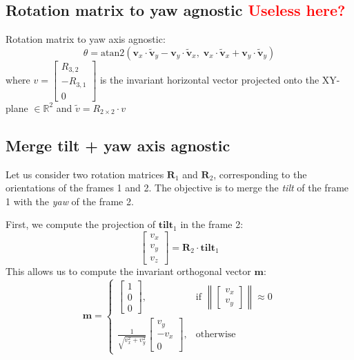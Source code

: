 \documentclass{IJCAS}
\begin{document}
\subsection{Rotation matrix to yaw agnostic \textcolor{red}{Useless here?}}

Rotation matrix to yaw axis agnostic:
\begin{equation}
\theta = \mathrm{atan2}\left( \boldsymbol{v}_x \cdot \tilde{\boldsymbol{v}}_y - \boldsymbol{v}_y \cdot \tilde{\boldsymbol{v}}_x,\; \boldsymbol{v}_x \cdot \tilde{\boldsymbol{v}}_x + \boldsymbol{v}_y \cdot \tilde{\boldsymbol{v}}_y \right)
\end{equation}
where $v=\begin{bmatrix}
R_{3,2} \\
- R_{3,1} \\
0
\end{bmatrix}$ is the invariant horizontal vector projected onto the XY-plane $\in \mathbb{R}^2$ and $\tilde{v} = R_{2\times2} \cdot v$

\subsection{Merge tilt + yaw axis agnostic}

Let us consider two rotation matrices $\boldsymbol{R}_{1}$ and $\boldsymbol{R}_{2}$, corresponding to the orientations of the frames 1 and 2. The objective is to merge the \emph{tilt} of the frame 1 with the \emph{yaw} of the frame 2.

First, we compute the projection of $\boldsymbol{tilt}_1$ in the frame 2:
\begin{equation}
    \begin{bmatrix} v_x \\ v_y \\ v_z \end{bmatrix} = \boldsymbol{R}_{2} \cdot \boldsymbol{tilt}_1
\end{equation}
This allows us to compute the invariant orthogonal vector $\boldsymbol{m}$:
\begin{equation}
    \boldsymbol{m} = 
    \begin{cases}
        \begin{bmatrix} 1 \\ 0 \\ 0 \end{bmatrix}, & \text{if } \left\| \begin{bmatrix} v_x \\ v_y \end{bmatrix} \right\| \approx 0 \\[12pt]
        \frac{1}{\sqrt{v_x^2 + v_y^2}}
        \begin{bmatrix} v_y \\ - v_x \\ 0 \end{bmatrix}, & \text{otherwise}
    \end{cases}
\end{equation}
\end{document}

